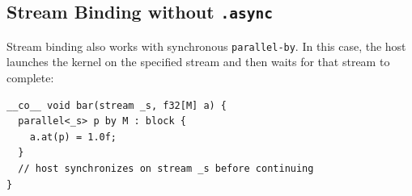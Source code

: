 \subsection*{Stream Binding without \texttt{.async}}

Stream binding also works with synchronous \texttt{parallel-by}. In this case, the host launches the kernel on the specified stream and then waits for that stream to complete:

\begin{lstlisting}[language=croqtile,caption={Stream Binding without .async}]
__co__ void bar(stream _s, f32[M] a) {
  parallel<_s> p by M : block {
    a.at(p) = 1.0f;
  }
  // host synchronizes on stream _s before continuing
}
\end{lstlisting}
